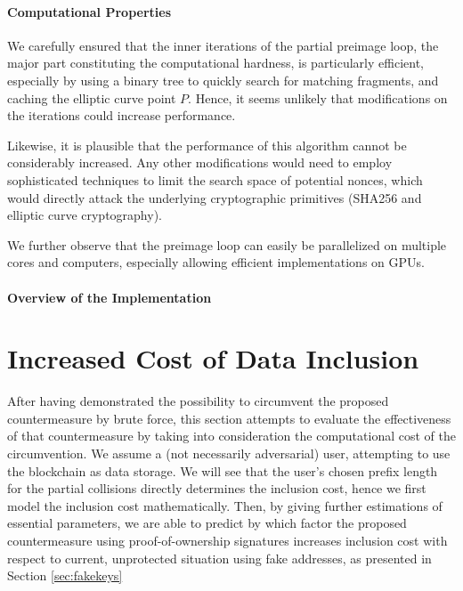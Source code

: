 \documentclass[a4paper,11pt,titlepage]{scrbook}
\begin{document}
\subsubsection*{Computational Properties}

We carefully ensured that the inner iterations of the partial preimage loop, the major part constituting the computational hardness, is particularly efficient, especially by using a binary tree to quickly search for matching fragments, and caching the elliptic curve point $P$.
Hence, it seems unlikely that modifications on the iterations could increase performance.

Likewise, it is plausible that the performance of this algorithm cannot be considerably increased.
Any other modifications would need to employ sophisticated techniques to limit the search space of potential nonces, which would directly attack the underlying cryptographic primitives (SHA256 and elliptic curve cryptography).

We further observe that the preimage loop can easily be parallelized on multiple cores and computers, especially allowing efficient implementations on GPUs.

\subsubsection*{Overview of the Implementation}



\chapter{Increased Cost of Data Inclusion}\label{chap:evaluation}

After having demonstrated the possibility to circumvent the proposed countermeasure by brute force, this section attempts to evaluate the effectiveness of that countermeasure by taking into consideration the computational cost of the circumvention. 
We assume a (not necessarily adversarial) user, attempting to use the blockchain as data storage.
We will see that the user's chosen prefix length for the partial collisions directly determines the inclusion cost, hence we first model the inclusion cost mathematically. Then, by giving further estimations of essential parameters, we are able to predict by which factor the proposed countermeasure using proof-of-ownership signatures increases inclusion cost with respect to current, unprotected situation using fake addresses, as presented in Section \ref{sec:fakekeys}
\end{document}
